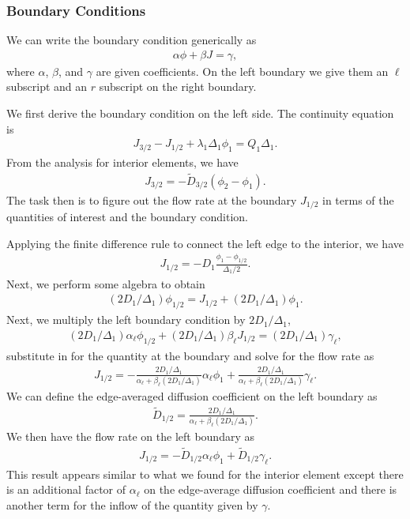 \subsubsection{Boundary Conditions}

We can write the boundary condition generically as
\begin{align}
  \alpha \phi + \beta J = \gamma ,
\end{align}
where $\alpha$, $\beta$, and $\gamma$ are given coefficients. On the left boundary we give them an $\ell$ subscript and an $r$ subscript on the right boundary.

We first derive the boundary condition on the left side. The continuity equation is
\begin{align}
  J_{3/2} - J_{1/2} + \lambda_1 \Delta_1 \phi_1 = Q_1 \Delta_1 .
\end{align}
From the analysis for interior elements, we have
\begin{align}
  J_{3/2} = -\widetilde{D}_{3/2} ( \phi_2 - \phi_1 ) .
\end{align}
The task then is to figure out the flow rate at the boundary $J_{1/2}$ in terms of the quantities of interest and the boundary condition.

Applying the finite difference rule to connect the left edge to the interior, we have
\begin{align}
  J_{1/2} = -D_1 \frac{ \phi_1 - \phi_{1/2} }{ \Delta_1 / 2 } .
\end{align}
Next, we perform some algebra to obtain
\begin{align}
  ( 2 D_1 / \Delta_1 ) \phi_{1/2} = J_{1/2} + ( 2 D_1 / \Delta_1 ) \phi_1 .
\end{align}
Next, we multiply the left boundary condition by $2 D_1 / \Delta_1$,
\begin{align}
  ( 2 D_1 / \Delta_1 ) \alpha_\ell \phi_{1/2} + ( 2 D_1 / \Delta_1 ) \beta_\ell J_{1/2} = ( 2 D_1 / \Delta_1 ) \gamma_\ell,
\end{align}
substitute in for the quantity at the boundary and solve for the flow rate as
\begin{align}
  J_{1/2} = - \frac{ 2 D_1 / \Delta_1 }{ \alpha_\ell + \beta_\ell ( 2 D_1 / \Delta_1 ) } \alpha_\ell \phi_1 + \frac{ 2 D_1 / \Delta_1 }{ \alpha_\ell + \beta_\ell ( 2 D_1 / \Delta_1 ) } \gamma_\ell .
\end{align}
We can define the edge-averaged diffusion coefficient on the left boundary as
\begin{align}
  \widetilde{D}_{1/2} = \frac{ 2 D_1 / \Delta_1 }{ \alpha_\ell + \beta_\ell ( 2 D_1 / \Delta_1 ) } .
\end{align}
We then have the flow rate on the left boundary as
\begin{align}
  J_{1/2} = -\widetilde{D}_{1/2} \alpha_\ell \phi_1 + \widetilde{D}_{1/2} \gamma_\ell .
\end{align}
This result appears similar to what we found for the interior element except there is an additional factor of $\alpha_\ell$ on the edge-average diffusion coefficient and there is another term for the inflow of the quantity given by $\gamma$.


